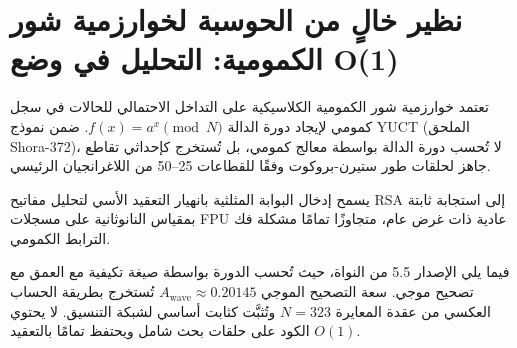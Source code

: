 \documentclass[12pt,a4paper]{article}
\begin{document}
	\section{نظير خالٍ من الحوسبة لخوارزمية شور الكمومية: التحليل في وضع O(1)}
	\label{sec:shor}
	
	تعتمد خوارزمية شور الكمومية الكلاسيكية على التداخل الاحتمالي للحالات في سجل كمومي لإيجاد دورة الدالة \(f(x) = a^x \pmod N\). ضمن نموذج YUCT (الملحق Shora-372)، لا تُحسب دورة الدالة بواسطة معالج كمومي، بل تُستخرج كإحداثي تقاطع جاهز لحلقات طور ستيرن-بروكوت وفقًا للقطاعات 25–50 من اللاغرانجيان الرئيسي.
	
	يسمح إدخال البوابة المثلثية بانهيار التعقيد الأسي لتحليل مفاتيح RSA إلى استجابة ثابتة بمقياس النانوثانية على مسجلات FPU عادية ذات غرض عام، متجاوزًا تمامًا مشكلة فك الترابط الكمومي.
	
	فيما يلي الإصدار 5.5 من النواة، حيث تُحسب الدورة بواسطة صيغة تكيفية مع العمق مع تصحيح موجي. سعة التصحيح الموجي \(A_{\text{wave}} \approx 0.20145\) تُستخرج بطريقة الحساب العكسي من عقدة المعايرة \(N = 323\) وتُثبَّت كثابت أساسي لشبكة التنسيق. لا يحتوي الكود على حلقات بحث شامل ويحتفظ تمامًا بالتعقيد \(O(1)\).
	
\end{document}
